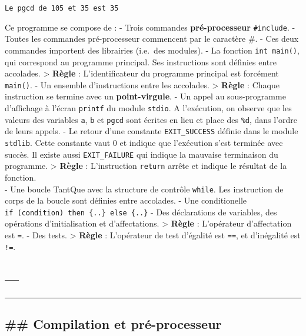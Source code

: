 \documentclass[11pt]{article}
\begin{document}
    \begin{Verbatim}[commandchars=\\\{\}]
Le pgcd de 105 et 35 est 35
    \end{Verbatim}

    Ce programme se compose de : - Trois commandes \textbf{pré-processeur}
\texttt{\#include}. - Toutes les commandes pré-processeur commencent par
le caractère \#. - Ces deux commandes importent des librairies (i.e.~des
modules). - La fonction \texttt{int\ main()}, qui correspond au
programme principal. Ses instructions sont définies entre accolades.
\textgreater{} \textbf{Règle} : L'identificateur du programme principal
est forcément \texttt{main()}. - Un ensemble d'instructions entre les
accolades. \textgreater{} \textbf{Règle} : Chaque instruction se termine
avec un \textbf{point-virgule}. - Un appel au sous-programme d'affichage
à l'écran \texttt{printf} du module \texttt{stdio}. A l'exécution, on
observe que les valeurs des variables \texttt{a}, \texttt{b} et
\texttt{pgcd} sont écrites en lieu et place des \texttt{\%d}, dans
l'ordre de leurs appels. - Le retour d'une constante
\texttt{EXIT\_SUCCESS} définie dans le module \texttt{stdlib}. Cette
constante vaut 0 et indique que l'exécution s'est terminée avec succès.
Il existe aussi \texttt{EXIT\_FAILURE} qui indique la mauvaise
terminaison du programme. \textgreater{} \textbf{Règle} : L'instruction
\texttt{return} arrête et indique le résultat de la fonction.\\
- Une boucle TantQue avec la structure de contrôle \texttt{while}. Les
instruction de corps de la boucle sont définies entre accolades. - Une
conditionelle \texttt{if\ (condition)\ then\ \{..\}\ else\ \{..\}} - Des
déclarations de variables, des opérations d'initialisation et
d'affectations. \textgreater{} \textbf{Règle} : L'opérateur
d'affectation est \texttt{=}. - Des tests. \textgreater{} \textbf{Règle}
: L'opérateur de test d'égalité est \texttt{==}, et d'inégalité est
\texttt{!=}.

    \hypertarget{section}{%
\subsection{---}\label{section}}

\begin{center}\rule{0.5\linewidth}{0.5pt}\end{center}

    \hypertarget{compilation-et-pruxe9-processeur}{%
\subsection{\#\# Compilation et
pré-processeur}\label{compilation-et-pruxe9-processeur}}
\end{document}
